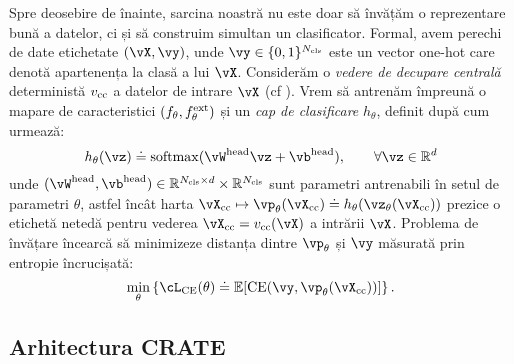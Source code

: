 \documentclass[../../book-main_ro.tex]{subfiles}
\begin{document}
Spre deosebire de înainte, sarcina noastră nu este doar să învățăm o reprezentare bună a datelor, ci și să construim simultan un clasificator. Formal, avem perechi de date etichetate \((\vX, \vy)\), unde \(\vy \in \{0, 1\}^{N_{\cls}}\) este un vector one-hot care denotă apartenența la clasă a lui \(\vX\). Considerăm o \textit{vedere de decupare centrală} deterministă \(v_{\mathrm{cc}}\) a datelor de intrare \(\vX\) (cf ). Vrem să antrenăm împreună o mapare de caracteristici \((f_{\theta}, f_{\theta}^{\mathrm{ext}})\) și un \textit{cap de clasificare} \(h_{\theta}\), definit după cum urmează:
\begin{equation}
    h_{\theta}(\vz) \doteq \softmax(\vW^{\head}\vz + \vb^{\head}), \qquad  \forall \vz \in \R^{d}
\end{equation}
unde \((\vW^{\head}, \vb^{\head}) \in \R^{N_{\cls} \times d} \times \R^{N_{\cls}}\) sunt parametri antrenabili în setul de parametri \(\theta\), astfel încât harta \(\vX_{\cc} \mapsto \vp_{\theta}(\vX_{\cc}) \doteq h_{\theta}(\vz_{\theta}(\vX_{\cc}))\) prezice o etichetă netedă pentru vederea \(\vX_{\cc} = v_{\cc}(\vX)\) a intrării \(\vX\). Problema de învățare încearcă să minimizeze distanța dintre \(\vp_{\theta}\) și \(\vy\) măsurată prin entropie încrucișată:
\begin{equation}\label{eq:classification_ce_loss}
    \min_{\theta}\bc{\cL_{\CE}(\theta) \doteq \Ex[\CE(\vy, \vp_{\theta}(\vX_{\cc}))]}.
\end{equation}


\subsection{Arhitectura CRATE}\label{sub:image_classification_architecture}
\end{document}
